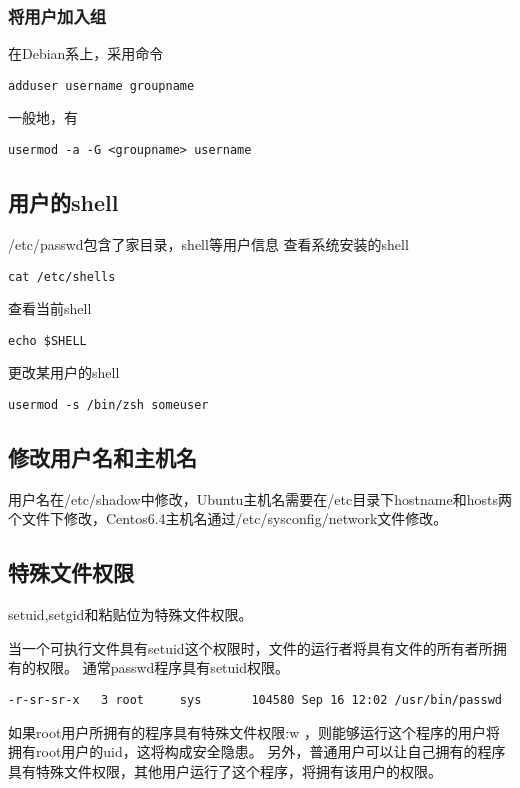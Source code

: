 \subsubsection{将用户加入组}
在Debian系上，采用命令
\begin{verbatim}
adduser username groupname 
\end{verbatim}

一般地，有
\begin{verbatim}
usermod -a -G <groupname> username
\end{verbatim}



\subsection{用户的shell}
/etc/passwd包含了家目录，shell等用户信息
查看系统安装的shell
\begin{verbatim}
cat /etc/shells
\end{verbatim}

查看当前shell
\begin{verbatim}
echo $SHELL
\end{verbatim}

更改某用户的shell
\begin{verbatim}
usermod -s /bin/zsh someuser
\end{verbatim}


\subsection{修改用户名和主机名}
用户名在/etc/shadow中修改，Ubuntu主机名需要在/etc目录下hostname和hosts两个文件下修改，Centos6.4主机名通过/etc/sysconfig/network文件修改。



\subsection{特殊文件权限}
setuid,setgid和粘贴位为特殊文件权限。

当一个可执行文件具有setuid这个权限时，文件的运行者将具有文件的所有者所拥有的权限。
通常passwd程序具有setuid权限。
\begin{verbatim}
-r-sr-sr-x   3 root     sys       104580 Sep 16 12:02 /usr/bin/passwd
\end{verbatim}

如果root用户所拥有的程序具有特殊文件权限:w
，则能够运行这个程序的用户将拥有root用户的uid，这将构成安全隐患。
另外，普通用户可以让自己拥有的程序具有特殊文件权限，其他用户运行了这个程序，将拥有该用户的权限。

